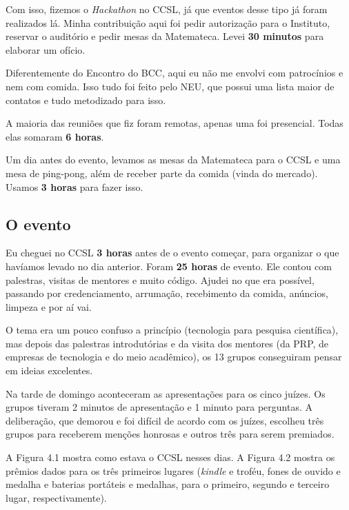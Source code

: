 \documentclass[12pt,letterpaper]{article}
\begin{document}
	Com isso, fizemos o \textit{Hackathon} no CCSL, já que eventos desse tipo já foram realizados lá. Minha contribuição aqui foi pedir autorização para o Instituto, reservar o auditório e pedir mesas da Matemateca. Levei \textbf{30 minutos} para elaborar um ofício. 
	
	Diferentemente do Encontro do BCC, aqui eu não me envolvi com patrocínios e nem com comida. Isso tudo foi feito pelo NEU, que possui uma lista maior de contatos e tudo metodizado para isso.
	
	A maioria das reuniões que fiz foram remotas, apenas uma foi presencial. Todas elas somaram \textbf{6 horas}.

	Um dia antes do evento, levamos as mesas da Matemateca para o CCSL e uma mesa de ping-pong, além de receber parte da comida (vinda do mercado). Usamos \textbf{3 horas} para fazer isso.
	
	\subsection{O evento}
	Eu cheguei no CCSL \textbf{3 horas} antes de o evento começar, para organizar o que havíamos levado no dia anterior. Foram \textbf{25 horas} de evento. Ele contou com palestras, visitas de mentores e muito código. Ajudei no que era possível, passando por credenciamento, arrumação, recebimento da comida, anúncios, limpeza e por aí vai.
	
	O tema era um pouco confuso a princípio (tecnologia para pesquisa científica), mas depois das palestras introdutórias e da visita dos mentores (da PRP, de empresas de tecnologia e do meio acadêmico), os 13 grupos conseguiram pensar em ideias excelentes.
	
	Na tarde de domingo aconteceram as apresentações para os cinco juízes. Os grupos tiveram 2 minutos de apresentação e 1 minuto para perguntas. A deliberação, que demorou e foi difícil de acordo com os juízes, escolheu três grupos para receberem menções honrosas e outros três para serem premiados. 
	
	A Figura 4.1 mostra como estava o CCSL nesses dias. A Figura 4.2 mostra os prêmios dados para os três primeiros lugares (\textit{kindle} e troféu, fones de ouvido e medalha e baterias portáteis e medalhas, para o primeiro, segundo e terceiro lugar, respectivamente).
	
\end{document}
